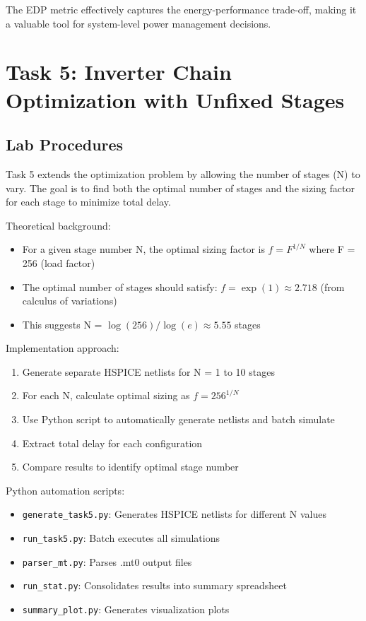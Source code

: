 \documentclass[UTF8,12pt,a4paper]{ctexart}
\begin{document}
The EDP metric effectively captures the energy-performance trade-off, making it a valuable tool for system-level power management decisions.

\section{Task 5: Inverter Chain Optimization with Unfixed Stages}

\subsection{Lab Procedures}

Task 5 extends the optimization problem by allowing the number of stages (N) to vary. The goal is to find both the optimal number of stages and the sizing factor for each stage to minimize total delay.

Theoretical background:
\begin{itemize}
    \item For a given stage number N, the optimal sizing factor is $f = F^{1/N}$ where F = 256 (load factor)
    \item The optimal number of stages should satisfy: $f = \exp(1) \approx 2.718$ (from calculus of variations)
    \item This suggests N = $\log(256)/\log(e) \approx 5.55$ stages
\end{itemize}

Implementation approach:
\begin{enumerate}
    \item Generate separate HSPICE netlists for N = 1 to 10 stages
    \item For each N, calculate optimal sizing as $f = 256^{1/N}$
    \item Use Python script to automatically generate netlists and batch simulate
    \item Extract total delay for each configuration
    \item Compare results to identify optimal stage number
\end{enumerate}

Python automation scripts:
\begin{itemize}
    \item \texttt{generate\_task5.py}: Generates HSPICE netlists for different N values
    \item \texttt{run\_task5.py}: Batch executes all simulations
    \item \texttt{parser\_mt.py}: Parses .mt0 output files
    \item \texttt{run\_stat.py}: Consolidates results into summary spreadsheet
    \item \texttt{summary\_plot.py}: Generates visualization plots
\end{itemize}
\end{document}
